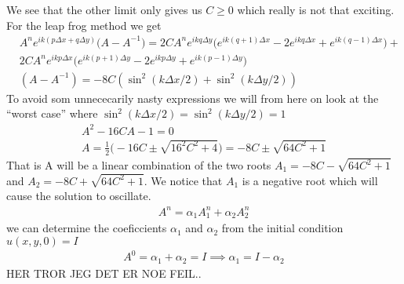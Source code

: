 \documentclass[a4paper,english, 10pt, twoside]{article}
\begin{document}
We see that the other limit only gives us $C\geq 0$ which really is not that exciting. \\
For the leap frog method we get
\begin{align*}
  &A^ne^{ik(p\Delta x +q\Delta y)}\big(A-A^{-1}\big) = 2CA^ne^{ikq\Delta y}\big(e^{ik(q+1)\Delta x} -2e^{ikq\Delta x}+
  e^{ik(q-1)\Delta x}\big)+\\
 &2CA^ne^{ikp\Delta x}\big(e^{ik(p+1)\Delta y} -2e^{ikp\Delta y} +e^{ik(p-1)\Delta y}\big) \\
 &(A-A^{-1}) = -8C(\sin^2(k\Delta x/2)+ \sin^2(k\Delta y/2))
\end{align*}
To avoid som unnececarily nasty expressions we will from here on look at the ``worst case'' where $\sin^2(k\Delta x/2) = 
\sin^2(k\Delta y/2) = 1$
\begin{align*}
 A^2 -16CA -1 = 0\\
 A = \frac{1}{2}\big(-16C \pm\sqrt{16^2C^2 +4}\big)  = -8C \pm\sqrt{64C^2+1}
\end{align*}
That is A will be a linear combination of the two roots $A_1 = -8C -\sqrt{64C^2+1}$ and $A_2 = -8C +\sqrt{64C^2+1}$.
We notice that $A_1$ is a negative root which will cause the solution to oscillate.
\begin{align*}
 A^n = \alpha_1A_1^n + \alpha_2A_2^n
\end{align*}
we can determine the coeficcients $\alpha_1$ and $\alpha_2$ from the initial condition $u(x,y,0) = I$
\begin{align*}
 A^0 = \alpha_1 + \alpha_2 = I \implies \alpha_1 = I-\alpha_2
\end{align*}
HER TROR JEG DET ER NOE FEIL..
\end{document}
